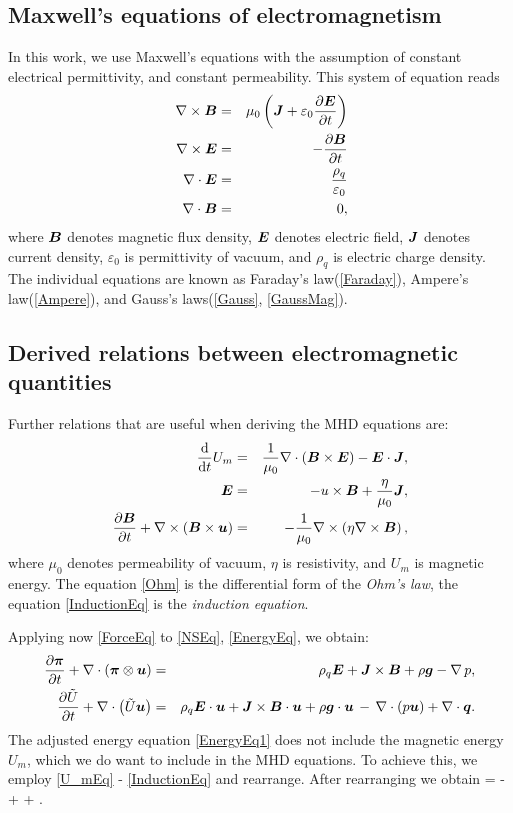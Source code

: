 \subsection{Maxwell's equations of electromagnetism}
In this work, we use Maxwell's equations with the assumption of constant electrical permittivity, and constant permeability. This system of equation reads
\begin{eqnarray}
\label{Ampere} \nabla \times \mbox{\boldmath $B$} & = & \mu_0 \left( \mbox{\boldmath $J$} + \varepsilon_0 \frac{\partial{\mbox{\boldmath $E$}}}{\partial{t}}\right)\\\
\label{Faraday} \nabla \times \mbox{\boldmath $E$} & = & -\frac{\partial{\mbox{\boldmath $B$}}}{\partial{t}}\\
\label{Gauss} \nabla \cdot \mbox{\boldmath $E$} & = & \frac{\rho_q}{\varepsilon_0}\\
\label{GaussMag} \nabla \cdot \mbox{\boldmath $B$} & = &0,
\end{eqnarray}
where $\mbox{\boldmath $B$}$ denotes magnetic flux density, $\mbox{\boldmath $E$}$ denotes electric field, $\mbox{\boldmath $J$}$ denotes current density, $\varepsilon_0$ is permittivity of vacuum, and $\rho_q$ is electric charge density.
The individual equations are known as Faraday's law(\ref{Faraday}), Ampere's law(\ref{Ampere}), and Gauss's laws(\ref{Gauss}, \ref{GaussMag}).


\subsection{Derived relations between electromagnetic quantities}
Further relations that are useful when deriving the MHD equations are:
\begin{eqnarray}
\label{U_mEq} \frac{\text{d}}{\text{d}t} U_m & = & \frac{1}{\mu_0}\nabla \cdot \left( \mbox{\boldmath $B$}\times\mbox{\boldmath $E$}\right) - \mbox{\boldmath $E$}\cdot\mbox{\boldmath $J$},\\
\label{Ohm} \mbox{\boldmath $E$} & = & -u \times \mbox{\boldmath $B$} + \frac{\eta}{\mu_0}\mbox{\boldmath $J$},\\
\label{InductionEq} \frac{\partial{\mbox{\boldmath $B$}}}{\partial{t}} + \nabla \times \left( \mbox{\boldmath $B$} \times \mbox{\boldmath $u$} \right) & = & -\frac{1}{\mu_0} \nabla \times \left( \eta \nabla \times \mbox{\boldmath $B$} \right),
\end{eqnarray}
where $\mu_0$ denotes permeability of vacuum, $\eta$ is resistivity, and $U_m$ is magnetic energy.
The equation \ref{Ohm} is the differential form of the \textit{Ohm's law}, the equation \ref{InductionEq} is the \textit{induction equation}.

Applying now \ref{ForceEq} to \ref{NSEq}, \ref{EnergyEq}, we obtain:
\begin{eqnarray}
\label{NSEq1} \frac{\partial{\mbox{\boldmath $\pi$}}}{\partial{t}} + \nabla\cdot\left(\mbox{\boldmath $\pi$}\otimes\mbox{\boldmath $u$}\right)& = & \rho_q\mbox{\boldmath $E$} + \mbox{\boldmath $J$}\times\mbox{\boldmath $B$} + \rho\mbox{\boldmath $g$} - \nabla\,p,\\
\label{EnergyEq1} \frac{\partial{\tilde{U}}}{\partial{t}} + \nabla\cdot\left({\tilde{U}}\mbox{\boldmath $u$}\right) & = & \rho_q\mbox{\boldmath $E$}\cdot\mbox{\boldmath $u$} + \mbox{\boldmath $J$}\times\mbox{\boldmath $B$}\cdot\mbox{\boldmath $u$} + \rho\mbox{\boldmath $g$}\cdot\mbox{\boldmath $u$} \,-\,\nabla\cdot\left({p}\mbox{\boldmath $u$}\right) + \nabla\cdot\mbox{\boldmath $q$}.
\end{eqnarray}
The adjusted energy equation \ref{EnergyEq1} does not include the magnetic energy $U_m$, which we do want to include in the MHD equations. To achieve this, we employ \ref{U_mEq} - \ref{InductionEq} and rearrange. After rearranging we obtain
\be
\label{EnergyEqPrefinal}  = -\nabla\cdot{} + \rho \bfg \cdot \bfu + \nabla\cdot\bfq.
\ee


